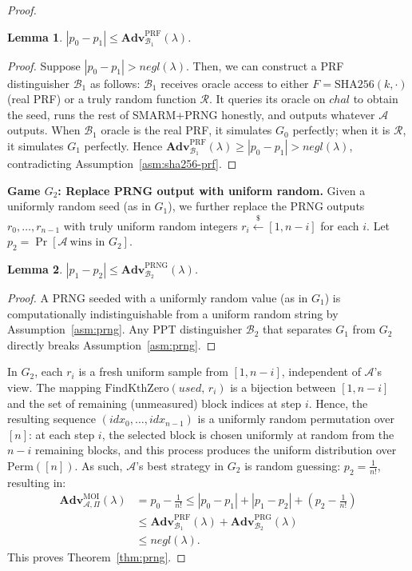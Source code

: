 \documentclass{ieeeaccess}
\newcommand{\rtsmarmone}{SMARM+PRNG\xspace}
\newtheorem{lemma}{Lemma}[section]
\newcommand{\Adv}{\mathbf{Adv}}
\begin{document}
\begin{proof}
\begin{lemma}
\label{lem:g0-g1}
$|p_0 - p_1| \leq \Adv^{\mathrm{PRF}}_{\mathcal{B}_1}(\lambda)$.
\end{lemma}
\begin{proof}
Suppose $|p_0 - p_1| > negl(\lambda)$.
Then, we can construct a PRF distinguisher $\mathcal{B}_1$ as follows:
$\mathcal{B}_1$ receives oracle access to either $F = \mathrm{SHA256}(k,\cdot)$
(real PRF) or a truly random function $\mathcal{R}$.
It queries its oracle on $\mathit{chal}$ to obtain the seed, runs the rest
of \rtsmarmone honestly, and outputs whatever $\mathcal{A}$ outputs.
When $\mathcal{B}_1$ oracle is the real PRF, it simulates $G_0$ perfectly;
when it is $\mathcal{R}$, it simulates $G_1$ perfectly.
Hence $\Adv^{\mathrm{PRF}}_{\mathcal{B}_1}(\lambda) \ge |p_0 - p_1| > negl(\lambda)$,
contradicting Assumption~\ref{asm:sha256-prf}.
\end{proof}
 
\medskip
\noindent\textbf{Game $G_2$: Replace PRNG output with uniform random.}
Given a uniformly random seed (as in $G_1$), we further replace the PRNG
outputs $r_0,\dots,r_{n-1}$ with truly uniform random integers
$r_i \xleftarrow{\$} [1, n-i]$ for each $i$.
Let $p_2 = \Pr[\mathcal{A}\ \text{wins in } G_2]$.
 
\begin{lemma}
\label{lem:g1-g2}
$|p_1 - p_2| \leq \Adv^{\mathrm{PRNG}}_{\mathcal{B}_2}(\lambda)$.
\end{lemma}
\begin{proof}
A PRNG seeded with a uniformly random value (as in $G_1$) is computationally indistinguishable from a uniform random string by Assumption~\ref{asm:prng}.
Any PPT distinguisher $\mathcal{B}_2$ that separates $G_1$ from $G_2$
directly breaks Assumption~\ref{asm:prng}.
\end{proof}
 
In $G_2$, each $r_i$ is a fresh uniform sample from $[1, n-i]$,
independent of $\mathcal{A}$'s view.
The mapping $\mathrm{FindKthZero}(\mathit{used},\, r_i)$ is a bijection
between $[1, n-i]$ and the set of remaining (unmeasured) block indices at
step $i$.
Hence, the resulting sequence
$(\mathit{idx}_0,\dots,\mathit{idx}_{n-1})$ is a uniformly random
permutation over $[n]$: at each step $i$, the selected block is chosen
uniformly at random from the $n - i$ remaining blocks, and this process
produces the uniform distribution over $\mathrm{Perm}([n])$.
As such, $\mathcal{A}$'s best strategy in $G_2$ is random guessing:
$p_2 = \frac{1}{n!}$, resulting in:
\[
\begin{aligned}
  \Adv^{\mathrm{MOI}}_{\mathcal{A},\Pi}(\lambda)
  &= p_0 - \tfrac{1}{n!}
  \leq |p_0 - p_1| + |p_1 - p_2| + (p_2 - \tfrac{1}{n!})\\
  &\leq \Adv^{\mathrm{PRF}}_{\mathcal{B}_1}(\lambda)
       + \Adv^{\mathrm{PRG}}_{\mathcal{B}_2}(\lambda)\\
  &\leq \mathit{negl}(\lambda).
\end{aligned}
\]
This proves Theorem~\ref{thm:prng}.
 
\end{proof}
 
\end{document}
